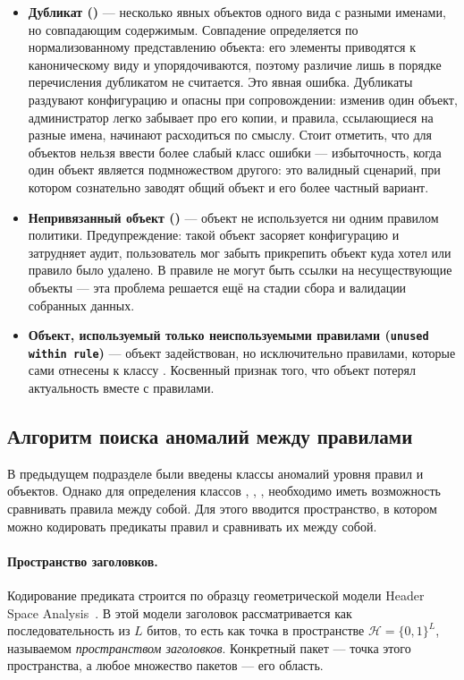 \begin{itemize}
    \item \textbf{Дубликат ()} --- несколько явных объектов одного вида с разными именами, но совпадающим содержимым. Совпадение определяется по нормализованному представлению объекта: его элементы приводятся к каноническому виду и упорядочиваются, поэтому различие лишь в порядке перечисления дубликатом не считается. Это явная ошибка. Дубликаты раздувают конфигурацию и опасны при сопровождении: изменив один объект, администратор легко забывает про его копии, и правила, ссылающиеся на разные имена, начинают расходиться по смыслу. Стоит отметить, что для объектов нельзя ввести более слабый класс ошибки --- избыточность, когда один объект является подмножеством другого: это валидный сценарий, при котором сознательно заводят общий объект и его более частный вариант.
    \item \textbf{Непривязанный объект ()} --- объект не используется ни одним правилом политики. Предупреждение: такой объект засоряет конфигурацию и затрудняет аудит, пользователь мог забыть прикрепить объект куда хотел или правило было удалено. В правиле не могут быть ссылки на несуществующие объекты --- эта проблема решается ещё на стадии сбора и валидации собранных данных.
    \item \textbf{Объект, используемый только неиспользуемыми правилами (\texttt{unused within rule})} --- объект задействован, но исключительно правилами, которые сами отнесены к классу . Косвенный признак того, что объект потерял актуальность вместе с правилами.
\end{itemize}

\subsection{Алгоритм поиска аномалий между правилами}
\label{sec:Section3:algorithm}

В предыдущем подразделе были введены классы аномалий уровня правил и объектов. Однако для определения классов , , ,  необходимо иметь возможность сравнивать правила между собой. Для этого вводится пространство, в котором можно кодировать предикаты правил и сравнивать их между собой.

\paragraph{Пространство заголовков.} Кодирование предиката строится по образцу геометрической модели Header Space Analysis~\cite{kazemian2012header}. В этой модели заголовок рассматривается как последовательность из $L$ битов, то есть как точка в пространстве $\mathcal{H} = \{0,1\}^L$, называемом \emph{пространством заголовков}. Конкретный пакет --- точка этого пространства, а любое множество пакетов --- его область.

